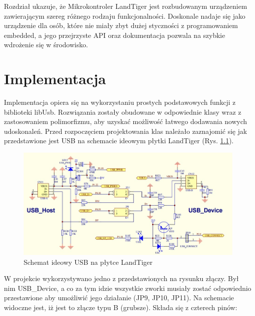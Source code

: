 \documentclass{BscUS}
\newcommand\blankpage{%
    \null
    \thispagestyle{empty}%
    \newpage}
\begin{document}
\indent Rozdział ukazuje, że Mikrokontroler LandTiger jest rozbudowanym urządzeniem zawierającym szereg różnego rodzaju funkcjonalności. Doskonale nadaje się jako urządzenie dla osób, które nie miały zbyt dużej styczności z programowaniem embedded, a jego przejrzyste API oraz dokumentacja pozwala na szybkie wdrożenie się w środowisko. \cite{landtigerDesc}
\afterpage{\blankpage}
\chapter{Implementacja}
\label{implementationChapter}
Implementacja opiera się na wykorzystaniu prostych podstawowych funkcji z biblioteki libUsb. Rozwiązania zostały obudowane w odpowiednie klasy wraz z zastosowaniem polimorfizmu, aby uzyskać możliwość łatwego dodawania nowych udoskonaleń. Przed rozpoczęciem projektowania klas należało zaznajomić się jak przedstawione jest USB na schemacie ideowym płytki LandTiger (Rys. \ref{fig:usbSchema}).
\begin{figure}[H]
\centering
\includegraphics[width=1\textwidth]{./img/usbSchema}
\caption{Schemat ideowy USB na płytce LandTiger\cite{landtigerDesc}} 
\label{fig:usbSchema}
\end{figure}
\noindent W projekcie wykorzystywano jedno z przedstawionych na rysunku złączy. Był nim USB\_Device, a co za tym idzie wszystkie zworki musiały zostać odpowiednio przestawione aby umożliwić jego działanie (JP9, JP10, JP11). Na schemacie widoczne jest, iż jest to złącze typu B (grubsze). Składa się z czterech pinów:
\end{document}
